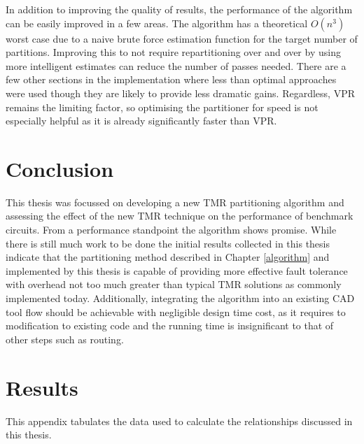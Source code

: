 \documentclass[12pt,final,oneside]{dwThesis} %
\begin{document}
   In addition to improving the quality of results, the performance of the algorithm can be easily improved in a few areas.
   The algorithm has a theoretical $O(n^3)$ worst case due to a naive brute force estimation function for the target number of partitions.
   Improving this to not require repartitioning over and over by using more intelligent estimates can reduce the number of passes needed.
   There are a few other sections in the implementation where less than optimal approaches were used though they are likely to provide less dramatic gains.
   Regardless, \gls{VPR} remains the limiting factor, so optimising the partitioner for speed is not especially helpful as it is already significantly faster than \gls{VPR}.


   \chapter{Conclusion}
   This thesis was focussed on developing a new TMR
   partitioning algorithm and assessing the effect of the new \gls{TMR}
   technique on the performance of benchmark circuits. From a performance
   standpoint the algorithm shows promise. While there is still much work to be
   done the initial results collected in this thesis indicate that the
   partitioning method described in Chapter \ref{algorithm} and implemented by this
   thesis is capable of providing more effective fault tolerance with overhead
   not too much greater than typical \gls{TMR} solutions as commonly
   implemented today. Additionally, integrating the algorithm into an existing \gls{CAD} tool flow 
   should be achievable with negligible design time cost, as it requires to modification to existing code and
   the running time is insignificant to that of other steps such as routing.


   \appendix 
   \chapter{Results}
   This appendix tabulates the data used to
   calculate the relationships discussed in this thesis.
\end{document}

